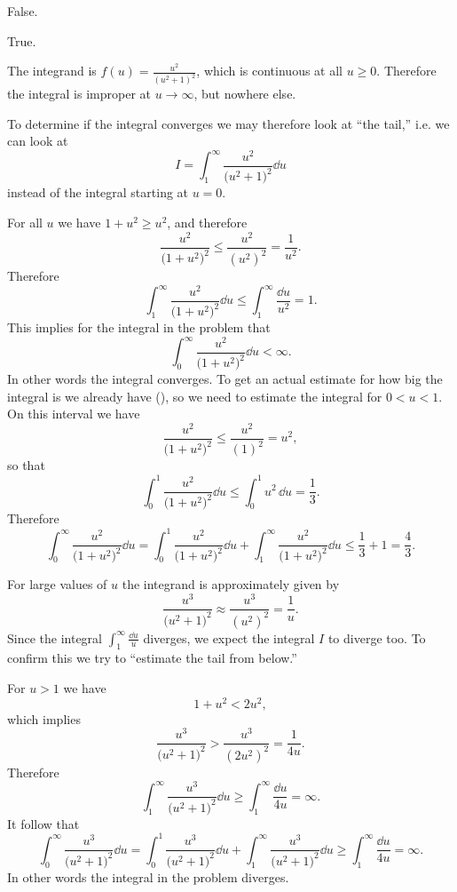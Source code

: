 \item[{\bfseries(II6.10)}]
False.
\bigskip

\item[{\bfseries(II6.11)}]
True.
\bigskip

\item[{\bfseries(II6.12)}]
The integrand is $f(u) = \frac{u^2} {(u^2+1)^2}$, which is continuous at all
$u\geq 0$.  Therefore the integral is improper at $u\to\infty$, but nowhere else.

To determine if the integral converges we may therefore look at ``the tail,''
i.e. we can look at
\[
  I = \int_1^\infty \frac{u^2} {\bigl(u^2+1\bigr)^2} \dd u
\]
instead of the integral starting at $u=0$.

For all $u$ we have $1+u^2 \geq u^2$, and therefore
\[
  \frac{u^2}{\bigl(1+u^2\bigr)^2} \leq \frac{u^2}{(u^2)^2} = \frac{1}{u^2}.
\]
Therefore
\[
  \int_1^\infty \frac{u^2}{\bigl(1+u^2\bigr)^2} \dd u
  \leq \int_1^\infty \frac{\dd u}{u^2} = 1. \tag{\dag}
\]
This implies for the integral in the problem that
\[
  \int_0^\infty\frac{u^2}{\bigl(1+u^2\bigr)^2}\dd u <\infty.
\]
In other words the integral converges.  To get an actual estimate for how big
the integral is we already have (\dag), so we need to estimate the integral for
$0<u<1$.  On this interval we have
\[
  \frac{u^2}{\bigl(1+u^2\bigr)^2} \leq \frac{u^2}{(1)^2} = u^2,
\]
so that
\[
  \int_0^1 \frac{u^2}{\bigl(1+u^2\bigr)^2} \dd u
  \leq \int_0^1 u^2\,\dd u = \frac{1}{3}. \tag{\ddag}
\]
Therefore
\[
  \int_0^\infty \frac{u^2}{\bigl(1+u^2\bigr)^2} \dd u
  =
  \int_0^1 \frac{u^2}{\bigl(1+u^2\bigr)^2} \dd u
  +
  \int_1^\infty \frac{u^2}{\bigl(1+u^2\bigr)^2} \dd u
  \leq \frac{1}{3} + 1
  =\frac{4}{3}.
\]

\bigskip

\item[{\bfseries(II6.13)}]
For large values of $u$ the integrand is approximately given by
\[
  \frac{u^3} {\bigl(u^2+1\bigr)^2} \approx \frac{u^3}{(u^2)^2} = \frac{1}{u}.
\]
Since the integral $\int_1^\infty \frac{\dd u}{u}$ diverges, we expect the
integral $I$ to diverge too.  To confirm this we try to ``estimate the tail from
below.''

For $u>1$ we have
\[
  1+u^2 < 2u^2,
\]
which implies
\[
\frac{u^3} {\bigl(u^2+1\bigr)^2} >
\frac{u^3}{(2u^2)^2} =  \frac{1}{4u}.
\]
Therefore
\[
  \int_1^\infty \frac{u^3} {\bigl(u^2+1\bigr)^2} \dd u \geq
  \int_1^\infty \frac{\dd u}{4u} =\infty.
\]
It follow that
\[
  \int_0^\infty \frac{u^3} {\bigl(u^2+1\bigr)^2}\dd u
  =
  \int_0^1\frac{u^3} {\bigl(u^2+1\bigr)^2}\dd u
  +
  \int_1^\infty\frac{u^3} {\bigl(u^2+1\bigr)^2}\dd u
  \geq
  \int_1^\infty \frac{\dd u}{4u} =\infty.
\]
In other words the integral in the problem diverges.

